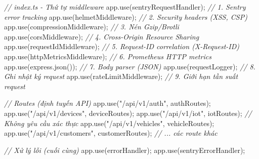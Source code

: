 \documentclass[a4paper]{extarticle}
\newenvironment{Shaded}{}{}
\newcommand{\CommentTok}[1]{\textcolor[rgb]{0.38,0.63,0.69}{\textit{#1}}}
\newcommand{\FunctionTok}[1]{\textcolor[rgb]{0.02,0.16,0.49}{#1}}
\newcommand{\NormalTok}[1]{#1}
\newcommand{\OperatorTok}[1]{\textcolor[rgb]{0.40,0.40,0.40}{#1}}
\newcommand{\StringTok}[1]{\textcolor[rgb]{0.25,0.44,0.63}{#1}}
\begin{document}
\begin{Shaded}
\begin{Highlighting}[]
\CommentTok{// index.ts {-} Thứ tự middleware}
\NormalTok{app}\OperatorTok{.}\FunctionTok{use}\NormalTok{(sentryRequestHandler)}\OperatorTok{;} \CommentTok{// 1. Sentry error tracking}
\NormalTok{app}\OperatorTok{.}\FunctionTok{use}\NormalTok{(helmetMiddleware)}\OperatorTok{;} \CommentTok{// 2. Security headers (XSS, CSP)}
\NormalTok{app}\OperatorTok{.}\FunctionTok{use}\NormalTok{(compressionMiddleware)}\OperatorTok{;} \CommentTok{// 3. Nén Gzip/Brotli}
\NormalTok{app}\OperatorTok{.}\FunctionTok{use}\NormalTok{(corsMiddleware)}\OperatorTok{;} \CommentTok{// 4. Cross{-}Origin Resource Sharing}
\NormalTok{app}\OperatorTok{.}\FunctionTok{use}\NormalTok{(requestIdMiddleware)}\OperatorTok{;} \CommentTok{// 5. Request{-}ID correlation (X{-}Request{-}ID)}
\NormalTok{app}\OperatorTok{.}\FunctionTok{use}\NormalTok{(httpMetricsMiddleware)}\OperatorTok{;} \CommentTok{// 6. Prometheus HTTP metrics}
\NormalTok{app}\OperatorTok{.}\FunctionTok{use}\NormalTok{(express}\OperatorTok{.}\FunctionTok{json}\NormalTok{())}\OperatorTok{;} \CommentTok{// 7. Body parser (JSON)}
\NormalTok{app}\OperatorTok{.}\FunctionTok{use}\NormalTok{(requestLogger)}\OperatorTok{;} \CommentTok{// 8. Ghi nhật ký request}
\NormalTok{app}\OperatorTok{.}\FunctionTok{use}\NormalTok{(rateLimitMiddleware)}\OperatorTok{;} \CommentTok{// 9. Giới hạn tần suất request}

\CommentTok{// Routes (định tuyến API)}
\NormalTok{app}\OperatorTok{.}\FunctionTok{use}\NormalTok{(}\StringTok{"/api/v1/auth"}\OperatorTok{,}\NormalTok{ authRoutes)}\OperatorTok{;}
\NormalTok{app}\OperatorTok{.}\FunctionTok{use}\NormalTok{(}\StringTok{"/api/v1/devices"}\OperatorTok{,}\NormalTok{ deviceRoutes)}\OperatorTok{;}
\NormalTok{app}\OperatorTok{.}\FunctionTok{use}\NormalTok{(}\StringTok{"/api/v1/iot"}\OperatorTok{,}\NormalTok{ iotRoutes)}\OperatorTok{;} \CommentTok{// Không yêu cầu xác thực}
\NormalTok{app}\OperatorTok{.}\FunctionTok{use}\NormalTok{(}\StringTok{"/api/v1/vehicles"}\OperatorTok{,}\NormalTok{ vehicleRoutes)}\OperatorTok{;}
\NormalTok{app}\OperatorTok{.}\FunctionTok{use}\NormalTok{(}\StringTok{"/api/v1/customers"}\OperatorTok{,}\NormalTok{ customerRoutes)}\OperatorTok{;}
\CommentTok{// ... các route khác}

\CommentTok{// Xử lý lỗi (cuối cùng)}
\NormalTok{app}\OperatorTok{.}\FunctionTok{use}\NormalTok{(errorHandler)}\OperatorTok{;}
\NormalTok{app}\OperatorTok{.}\FunctionTok{use}\NormalTok{(sentryErrorHandler)}\OperatorTok{;}
\end{Highlighting}
\end{Shaded}
\end{document}

